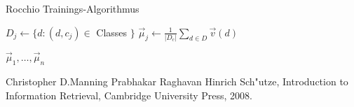 \documentclass[12pt,a4paper,twoside]{article}
\begin{document}
\begin{algorithm}
\caption{Rocchio Trainings-Algorithmus}
\begin{algorithmic}

\State $ D_j \gets  \{d : (d,c_j) \in$ Classes $\}$
\State  $\vec \mu_j \gets \frac{1}{|D_c|} \sum_{d \in D} \vec v (d)$
\EndFor

\Return ${\vec \mu_1, \dots , \vec \mu_n }$    
 \end{algorithmic}  
\end{algorithm}

\begin{thebibliography}{99}
Christopher D.Manning Prabhakar Raghavan Hinrich Sch"utze,
Introduction to Information Retrieval,
Cambridge University Press,
2008.
\end{thebibliography}
\end{document}
